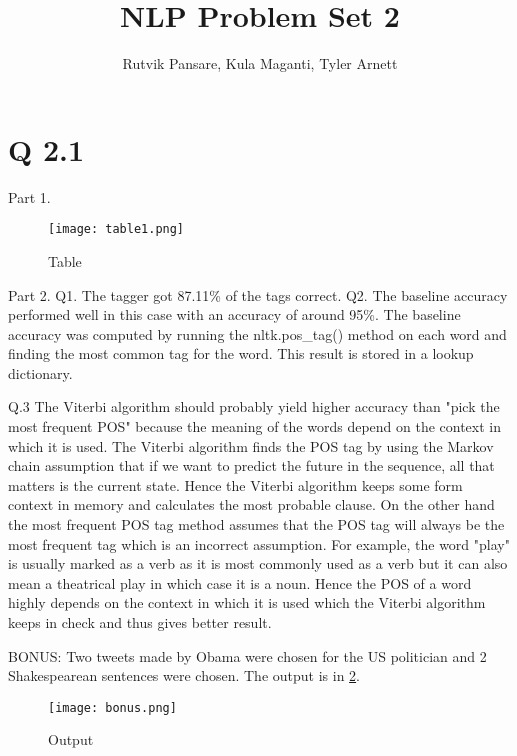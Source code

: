 \documentclass{article}
\title{NLP Problem Set 2}
\date{}
\author{Rutvik Pansare, Kula Maganti, Tyler Arnett}
\begin{document}
\maketitle

\section*{Q 2.1}


\begin{flushleft}

Part 1.

\begin{figure}[htp]
    \centering
    \texttt{[image: table1.png]}
    \caption{Table}
    \label{Table}
\end{figure}


Part 2.
\vskip 0.2in
Q1. 
The tagger got 87.11\% of the tags correct.
\vskip 0.2in
Q2. 
The baseline accuracy performed well in this case with an accuracy of around 95\%. The baseline accuracy was computed by running the nltk.pos\_tag() method on each word and finding the most common tag for the word. This result is stored in a lookup dictionary.
\vskip 0.2in

Q.3
The Viterbi algorithm should probably yield higher accuracy than "pick the most frequent POS" because the meaning of the words depend on the context in which it is used. The Viterbi algorithm finds the POS tag by using the Markov chain assumption that if we want to predict the future in the sequence, all that matters is the current state. Hence the Viterbi algorithm keeps some form context in memory and calculates the most probable clause. On the other hand the most frequent POS tag method assumes that the POS tag will always be the most frequent tag which is an incorrect assumption. For example, the word "play" is usually marked as a verb as it is most commonly used as a verb but it can also mean a theatrical play in which case it is a noun. Hence the POS of a word highly depends on the context in which it is used which the Viterbi algorithm keeps in check and thus gives better result.
\vskip 0.2in

BONUS:
Two tweets made by Obama were chosen for the US politician and 2 Shakespearean sentences were chosen.
The output is in \ref{output}.
\begin{figure}[htp]
    \centering
    \texttt{[image: bonus.png]}
    \caption{Output}
    \label{output}
\end{figure}
\vskip 0.2in


\end{flushleft}
\end{document}
